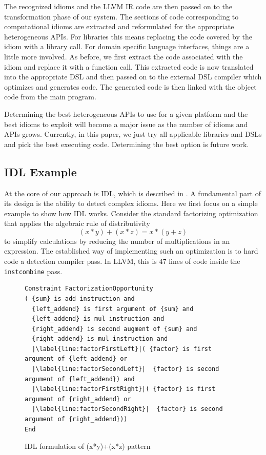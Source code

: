     The recognized idioms and the LLVM IR code are then passed on
    to the transformation phase of our system.
    The sections of code corresponding to computational idioms are extracted
    and reformulated for the appropriate heterogeneous APIs.
    For libraries this means replacing
    the code covered by the idiom with a library call. 
    For domain specific language interfaces,
    things are a little more involved. As before, we first extract the code
    associated with the idiom and replace it with a function call. This
    extracted code is now translated into the appropriate DSL and then
    passed on to the external DSL compiler which optimizes and generates
    code. The generated code is then linked
    with the object code from the main program.

    Determining the best heterogeneous APIs to use for a given platform
    and the best idioms to exploit will become a major issue as the number
    of idioms and APIs grows.  Currently, in this paper, we just try all
    applicable libraries and DSLs and pick the best executing
    code. Determining the best option is future work.

\subsection{IDL Example}

    At the core of our approach is IDL, which is described in .
    A fundamental part of its design is the
    ability to detect  complex idioms.  Here we first focus on a simple example
    to show how IDL works.  Consider the standard factorizing
    optimization that applies the algebraic rule of distributivity
    \[(x*y)+(x*z) = x*(y+z)\]
    to simplify calculations by reducing the number of multiplications in an
    expression.
    The established way of implementing such an optimization is to hard code a
    detection compiler pass.
    In LLVM, this is 47 lines of code inside the \texttt{instcombine} pass.

\begin{figure}[t]
\begin{lstlisting}[language={constraints},escapechar=|]
Constraint FactorizationOpportunity
( {sum} is add instruction and
  {left_addend} is first argument of {sum} and
  {left_addend} is mul instruction and
  {right_addend} is second augment of {sum} and
  {right_addend} is mul instruction and
  |\label{line:factorFirstLeft}|( {factor} is first argument of {left_addend} or
  |\label{line:factorSecondLeft}|  {factor} is second argument of {left_addend}) and
  |\label{line:factorFirstRight}|( {factor} is first argument of {right_addend} or
  |\label{line:factorSecondRight}|  {factor} is second argument of {right_addend}))
End
\end{lstlisting}
\vspace{-0.3cm}
\caption{IDL formulation of (x*y)+(x*z) pattern}
\label{fig:IDLfactorization}
\end{figure}

